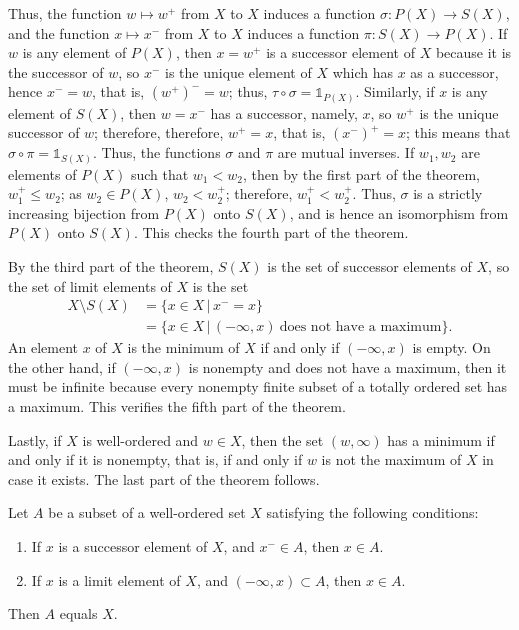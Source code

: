 \documentclass{article}
\begin{document}
Thus, the function \(w \mapsto w^+\) from \(X\) to \(X\) induces a
function \(\sigma : P(X) \to S(X)\), and the function
\(x \mapsto x^-\) from \(X\) to \(X\) induces a function
\(\pi : S(X) \to P(X)\).  If \(w\) is any element of \(P(X)\), then
\(x = w^+\) is a successor element of \(X\) because it is the
successor of \(w\), so \(x^-\) is the unique element of \(X\) which
has \(x\) as a successor, hence \(x^- = w\), that is, \((w^+)^- = w\);
thus, \(\tau \circ \sigma = \mathbb{1}_{P(X)}\).  Similarly, if \(x\)
is any element of \(S(X)\), then \(w = x^-\) has a successor, namely,
\(x\), so \(w^+\) is the unique successor of \(w\); therefore,
therefore, \(w^+ = x\), that is, \((x^-)^+ = x\); this means that
\(\sigma \circ \pi = \mathbb{1}_{S(X)}\).  Thus, the functions
\(\sigma\) and \(\pi\) are mutual inverses.  If \(w_1, w_2\) are
elements of \(P(X)\) such that \(w_1 < w_2\), then by the first part
of the theorem, \(w_1^+ \leq w_2\); as \(w_2 \in P(X)\),
\(w_2 < w_2^+\); therefore, \(w_1^+ < w_2^+\).  Thus, \(\sigma\) is a
strictly increasing bijection from \(P(X)\) onto \(S(X)\), and is
hence an isomorphism from \(P(X)\) onto \(S(X)\).  This checks the
fourth part of the theorem.

By the third part of the theorem, \(S(X)\) is the set of successor
elements of \(X\), so the set of limit elements of \(X\) is the set
\begin{align*}
  X \setminus S(X)
  &=
    \{ x \in X \,\vert\, x^- = x \} \\
  &=
    \{ x \in X \,\vert\,
    (-\infty, x) ~ \text{does not have a maximum} \}.
\end{align*}
An element \(x\) of \(X\) is the minimum of \(X\) if and only if
\((-\infty, x)\) is empty.  On the other hand, if \((-\infty, x)\) is
nonempty and does not have a maximum, then it must be infinite because
every nonempty finite subset of a totally ordered set has a maximum.
This verifies the fifth part of the theorem.

Lastly, if \(X\) is well-ordered and \(w \in X\), then the set
\((w, \infty)\) has a minimum if and only if it is nonempty, that is,
if and only if \(w\) is not the maximum of \(X\) in case it exists.
The last part of the theorem follows.

\begin{theorem}
  \label{thm:g5v2vli5}
  Let \(A\) be a subset of a well-ordered set \(X\) satisfying the
  following conditions:
  \begin{enumerate}
  \item If \(x\) is a successor element of \(X\), and \(x^- \in A\),
    then \(x \in A\).
  \item If \(x\) is a limit element of \(X\), and
    \((-\infty, x) \subset A\), then \(x \in A\).
  \end{enumerate}
  Then \(A\) equals \(X\).
\end{theorem}
\end{document}
